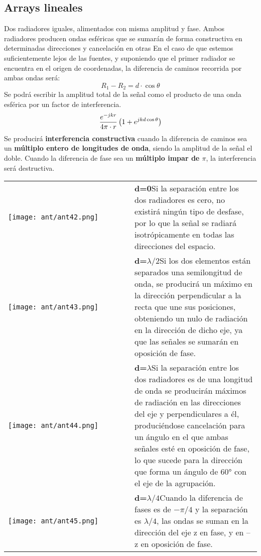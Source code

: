 \documentclass[
	12pt, %
	fleqn, %
	a4paper, %
	oneside, %
]{LegrandOrangeBook}
\begin{document}
\subsection{Arrays lineales}
Dos radiadores iguales, alimentados con misma amplitud y fase. Ambos radiadores producen ondas esféricas que se sumarán de forma
constructiva en determinadas direcciones y cancelación en otras
En el caso de que estemos suficientemente lejos de las fuentes, y suponiendo que el primer radiador se encuentra en el origen de coordenadas, la diferencia de caminos recorrida por ambas ondas será:
\begin{equation}
R_1-R_2=d\cdot\cos\theta
\end{equation}
Se podrá escribir la amplitud total de la señal como el producto de una onda esférica por un factor de interferencia.
\begin{equation}
\frac{e^{-jkr}}{4\pi\cdot r}\left(1+e^{jkd\cos\theta}\right)
\end{equation}
Se producirá \textbf{interferencia constructiva} cuando la diferencia de caminos sea un \textbf{múltiplo entero de longitudes de onda}, siendo la amplitud de la señal el doble. Cuando la diferencia de fase sea un\textbf{ múltiplo impar de $\pi$}, la interferencia será destructiva.
\begin{tabular}{k{0.5\linewidth}  j{0.5\linewidth}}
        \texttt{[image: ant/ant42.png]} & \textbf{d=0}\newline Si la separación entre los dos
radiadores es cero, no existirá
ningún tipo de desfase, por lo que
la señal se radiará isotrópicamente
en todas las direcciones del
espacio. \\
        \texttt{[image: ant/ant43.png]} & \textbf{d=$\lambda/2$}\newline Si los dos elementos están separados una semilongitud de onda, se
producirá un máximo en la dirección perpendicular a la recta que
une sus posiciones, obteniendo un nulo de radiación en la dirección
de dicho eje, ya que las señales se sumarán en oposición de fase.\\
        \texttt{[image: ant/ant44.png]} & \textbf{d=$\lambda$}\newline Si la separación entre los dos radiadores es de una longitud de onda
se producirán máximos de radiación en las direcciones del eje y
perpendiculares a él, produciéndose cancelación para un ángulo en
el que ambas señales esté en oposición de fase, lo que sucede para la
dirección que forma un ángulo de 60° con el eje de la agrupación. \\
        \texttt{[image: ant/ant45.png]} & \textbf{d=$\lambda/4$}\newline Cuando la diferencia de fases es de $-\pi/4$ y la separación es $\lambda/4$, las
ondas se suman en la dirección del eje z en fase, y en –z en oposición
de fase. 
\end{tabular}
\end{document}
